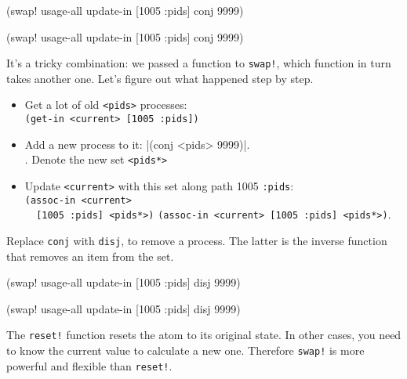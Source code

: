 \begin{clojure}
(swap! usage-all
  update-in [1005 :pids] conj 9999)
\end{clojure}

\else

\begin{clojure}
(swap! usage-all update-in [1005 :pids] conj 9999)
\end{clojure}

\fi

It's a tricky combination: we passed a function to \verb|swap!|, which function in turn takes another one. Let's figure out what happened step by step.

\begin{itemize}

\item
  Get a lot of old \verb|<pids>| processes:\\
  \verb|(get-in <current> [1005 :pids])|

\item
  Add a new process to it: \spverb|(conj <pids> 9999)|.\ifx\DEVICETYPE\MOBILE\ \else\\\fi.
  Denote the new set \verb|<pids*>|

\item
  Update \verb|<current>| with this set along path 1005 \arr{} \verb|:pids|:\\
  \ifx\DEVICETYPE\MOBILE
  \verb|(assoc-in <current>| \\
  \verb|  [1005 :pids] <pids*>)|
  \else
  \verb|(assoc-in <current> [1005 :pids] <pids*>)|.
  \fi

\end{itemize}

\noindent
Replace \verb|conj| with \verb|disj|, to remove a process. The latter is the inverse function that removes an item from the set.


\ifx\DEVICETYPE\MOBILE

\begin{clojure}
(swap! usage-all
  update-in [1005 :pids] disj 9999)
\end{clojure}

\else

\begin{clojure}
(swap! usage-all update-in [1005 :pids] disj 9999)
\end{clojure}

\fi

The \verb|reset!| function resets the atom to its original state. In other cases, you need to know the current value to calculate a new one.
Therefore \verb|swap!| is more powerful and flexible than \verb|reset!|.

